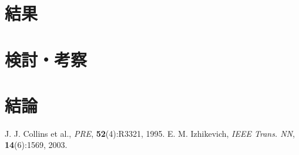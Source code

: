 \documentclass[12pt]{jarticle}
\begin{document}
\section{結果}

\section{検討・考察}

\section{結論}



\begin{thebibliography}{99}
    \label{sannkoubunnkenn_chapter}
    J. J. Collins et al.,
    {\em PRE}, {\bf 52}(4):R3321, 1995.
     E. M. Izhikevich,
    {\em IEEE Trans. NN}, {\bf 14}(6):1569, 2003.
\end{thebibliography}

\clearpage
\appendix

\end{document}
